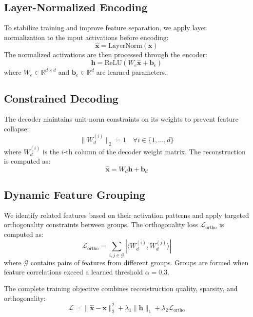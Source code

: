 \documentclass{article} %
\begin{document}
\subsection{Layer-Normalized Encoding}
To stabilize training and improve feature separation, we apply layer normalization to the input activations before encoding:
\begin{equation}
\hat{\mathbf{x}} = \text{LayerNorm}(\mathbf{x})
\end{equation}
The normalized activations are then processed through the encoder:
\begin{equation}
\mathbf{h} = \text{ReLU}(W_e\hat{\mathbf{x}} + \mathbf{b}_e)
\end{equation}
where $W_e \in \mathbb{R}^{d \times d}$ and $\mathbf{b}_e \in \mathbb{R}^d$ are learned parameters.

\subsection{Constrained Decoding}
The decoder maintains unit-norm constraints on its weights to prevent feature collapse:
\begin{equation}
\|W_d^{(i)}\|_2 = 1 \quad \forall i \in \{1,\ldots,d\}
\end{equation}
where $W_d^{(i)}$ is the $i$-th column of the decoder weight matrix. The reconstruction is computed as:
\begin{equation}
\hat{\mathbf{x}} = W_d\mathbf{h} + \mathbf{b}_d
\end{equation}

\subsection{Dynamic Feature Grouping}
We identify related features based on their activation patterns and apply targeted orthogonality constraints between groups. The orthogonality loss $\mathcal{L}_{\text{ortho}}$ is computed as:
\begin{equation}
\mathcal{L}_{\text{ortho}} = \sum_{i,j \in \mathcal{G}} |\langle W_d^{(i)}, W_d^{(j)} \rangle|
\end{equation}
where $\mathcal{G}$ contains pairs of features from different groups. Groups are formed when feature correlations exceed a learned threshold $\alpha=0.3$.

The complete training objective combines reconstruction quality, sparsity, and orthogonality:
\begin{equation}
\mathcal{L} = \|\hat{\mathbf{x}} - \mathbf{x}\|_2^2 + \lambda_1\|\mathbf{h}\|_1 + \lambda_2\mathcal{L}_{\text{ortho}}
\end{equation}
\end{document}
